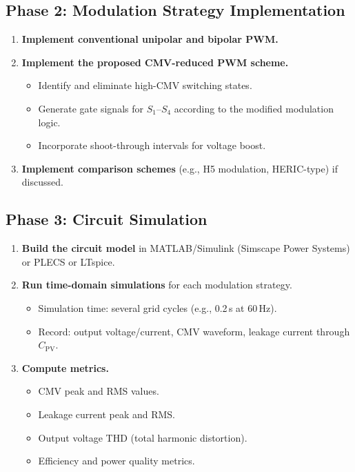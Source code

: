 \documentclass[11pt,a4paper]{article}
\begin{document}
\subsection{Phase 2: Modulation Strategy Implementation}
\begin{enumerate}[label=\textbf{2.\arabic*}]
  \item \textbf{Implement conventional unipolar and bipolar PWM.}
  \item \textbf{Implement the proposed CMV-reduced PWM scheme.}
    \begin{itemize}
      \item Identify and eliminate high-CMV switching states.
      \item Generate gate signals for $S_1$--$S_4$ according to the modified modulation logic.
      \item Incorporate shoot-through intervals for voltage boost.
    \end{itemize}
  \item \textbf{Implement comparison schemes} (e.g., H5 modulation, HERIC-type) if discussed.
\end{enumerate}

\subsection{Phase 3: Circuit Simulation}
\begin{enumerate}[label=\textbf{3.\arabic*}]
  \item \textbf{Build the circuit model} in MATLAB/Simulink (Simscape Power Systems) or PLECS or LTspice.
  \item \textbf{Run time-domain simulations} for each modulation strategy.
    \begin{itemize}
      \item Simulation time: several grid cycles (e.g., 0.2\,s at 60\,Hz).
      \item Record: output voltage/current, CMV waveform, leakage current through $C_{\text{PV}}$.
    \end{itemize}
  \item \textbf{Compute metrics.}
    \begin{itemize}
      \item CMV peak and RMS values.
      \item Leakage current peak and RMS.
      \item Output voltage THD (total harmonic distortion).
      \item Efficiency and power quality metrics.
    \end{itemize}
\end{enumerate}
\end{document}
